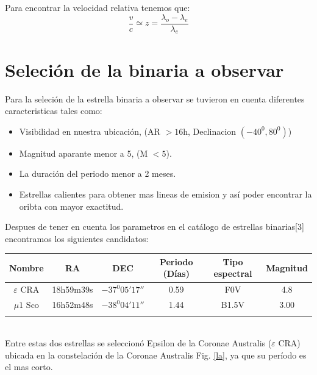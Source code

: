 \documentclass[Proceedings]{ascelike}
\begin{document}
Para encontrar la velocidad relativa tenemos que:
\begin{equation}
\dfrac{v}{c} \simeq z = \dfrac{\lambda_{o} - \lambda_{e}}{ \lambda_{e}}
\label{v}
\end{equation} 

\section{Seleci\'on de la binaria a observar}

Para la seleci\'on de la estrella binaria a observar se tuvieron en cuenta 
diferentes caracteristicas tales como:

\begin{itemize}
\item Visibilidad en nuestra ubicaci\'on, (AR $> 16$h, Declinacion $(-40^{0}, 80^{0})$)
\item Magnitud aparante menor a 5, (M $<5$).
\item La duraci\'on del periodo menor a 2 meses.
\item Estrellas calientes para obtener mas lineas de emision y as\'i poder
encontrar la oribta con mayor exactitud.
\end{itemize}

Despues de tener en cuenta los parametros en el cat\'alogo de estrellas binarias[3] encontramos los siguientes candidatos:\\

\begin{tabular}{c c c c c c}
\hline
Nombre & RA & DEC & Periodo (D\'ias) & Tipo espectral & Magnitud\\
\hline
$\varepsilon$ $\mathrm{CRA}$ & 18h59m39s & $-37^{0}05' 17''$ & 0.59 & F0V & 4.8\\
\hline
$\mu 1$ $\mathrm{Sco}$ & 16h52m48s & $-38^{0}04'11''$& 1.44 & B1.5V& 3.00\\
\hline
\\
\end{tabular}
\\
Entre estas dos estrellas se seleccion\'o Epsilon de la Coronae Australis (${\varepsilon}$ CRA) ubicada en la 
constelaci\'on de la Coronae Australis Fig. \ref{la}, ya que su per\'iodo es el mas corto. 
\end{document}
